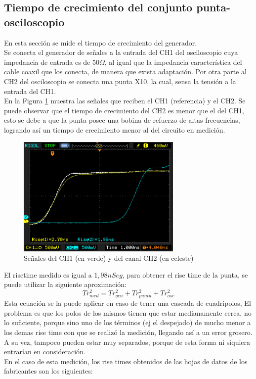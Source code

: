 \documentclass[a4paper,10pt]{article}
\begin{document}
		\newpage
		\subsection{Tiempo de crecimiento del conjunto punta-osciloscopio}
		
		\indent En esta secci\'on se mide el tiempo de crecimiento del 
		generador. \\
 		\indent Se conecta el generador de se\~nales a la entrada del CH1 del
		osciloscopio cuya impedancia de entrada es de $50 \Omega$, al igual 
		que la impedancia caracter\'istica del cable coaxil que los conecta, 
		de manera que exista adaptaci\'on. Por otra parte al CH2 del 
		osciloscopio se conecta una punta X10, la cual, sensa la tensi\'on a 
		la entrada del CH1. \\
		\indent En la Figura \ref{img008} muestra las se\~nales que
		reciben el CH1 (referencia) y el CH2. Se puede observar que el tiempo
		de crecimiento del CH2 es menor que el del CH1, esto se debe a que la
		punta posee una bobina de refuerzo de altas frecuencias, logrando así
		un tiempo de crecimiento menor al del circuito en medición.
		
		\begin{figure}[!htb]
			\centering
			\includegraphics[width=8cm]
			{Imagenes/Mediciones instrumentos/NewFile10.png}
			\caption{Se\~nales del CH1 (en verde) y del canal CH2 (en celeste)
			} \label{img008}
		\end{figure}
		\indent El risetime medido es igual a $1,98 nSeg$, para obtener el 
		rise time de la punta, se puede utilizar la siguiente aproximación:
		$$Tr_{med}^2 = Tr_{gen}^2 + Tr_{punta}^2 + Tr_{osc}^2$$
		\indent Esta ecuación se la puede aplicar en caso de tener una cascada
		de cuadripolos, El problema es que los polos de los mismos tienen que 
		estar medianamente cerca, no lo suficiente, porque sino uno de los 
		términos (ej el despejado) de mucho menor a los demas rise time con 
		que se realizó la medición, llegando así a un error grosero. A su vez,
		tampoco pueden estar muy separados, porque de esta forma ni siquiera 
		entrarían en consideración. \\
		\indent En el caso de esta medición, los rise times obtenidos de las 
		hojas de datos de los fabricantes son los siguientes: 
		
\end{document}
